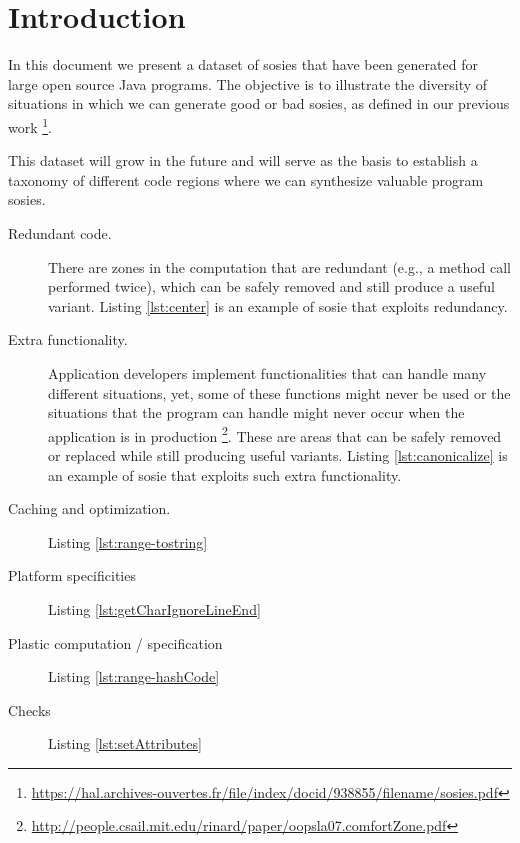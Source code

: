 \section{Introduction}

In this document we present a dataset of sosies that have been generated for large open source Java programs. 
The objective is to illustrate the diversity of situations in which we can generate good or bad sosies, as defined in our previous work \footnote{\url{https://hal.archives-ouvertes.fr/file/index/docid/938855/filename/sosies.pdf}}. 

This dataset will grow in the future and will serve as the basis to establish a taxonomy of different code regions where we can synthesize valuable program sosies. 

\begin{description}
  \item [Redundant code.] There are zones in the computation that are redundant (e.g., a method call performed twice), which can be safely removed and still produce a useful variant. Listing  \ref{lst:center} is an example of sosie that exploits redundancy.
  \item [Extra functionality.] Application developers implement functionalities that can handle many different situations, yet, some of these functions might never be used or the situations that the program can handle might never occur when the application is in production \footnote{\url{http://people.csail.mit.edu/rinard/paper/oopsla07.comfortZone.pdf}}. These are areas that can be safely removed or replaced while still producing useful variants. Listing \ref{lst:canonicalize} is an example of sosie that exploits such extra functionality.
  \item [Caching and optimization.] Listing \ref{lst:range-tostring}
  \item [Platform specificities] Listing \ref{lst:getCharIgnoreLineEnd}
  \item [Plastic computation / specification] Listing \ref{lst:range-hashCode}
  \item [Checks] Listing \ref{lst:setAttributes}
\end{description}